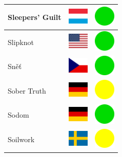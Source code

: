 \documentclass[12pt, a4paper, twoside]{report}
\begin{document}
\begin{center}
\begin{longtable}{|p{5cm}|p{2cm}|p{2cm}|}
 Sleepers' Guilt                                            & \includegraphics[width=1cm]{../img/flags/lu} &   \includegraphics[width=1cm]{../likes/y} \\ \hline
 Slipknot                                                   & \includegraphics[width=1cm]{../img/flags/us} &   \includegraphics[width=1cm]{../likes/y} \\ \hline
 Sněť                                                       & \includegraphics[width=1cm]{../img/flags/cz} &   \includegraphics[width=1cm]{../likes/y} \\ \hline
 Sober Truth                                                & \includegraphics[width=1cm]{../img/flags/de} &   \includegraphics[width=1cm]{../likes/m} \\ \hline
 Sodom                                                      & \includegraphics[width=1cm]{../img/flags/de} &   \includegraphics[width=1cm]{../likes/y} \\ \hline
 Soilwork                                                   & \includegraphics[width=1cm]{../img/flags/se} &   \includegraphics[width=1cm]{../likes/m} \\ \hline

\end{longtable}
\end{center}
\end{document}

